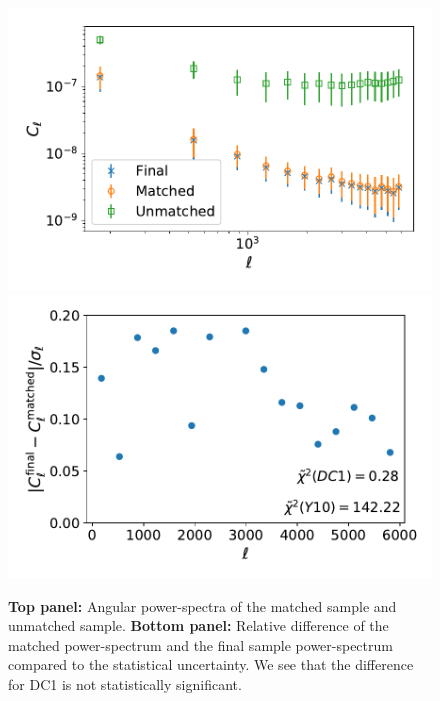 \documentclass[twocolumn]{aastex62}
\begin{document}
\begin{figure}
\centering
\includegraphics[width=0.9\columnwidth]{cl_matched_unmatched}
\includegraphics[width=0.9\columnwidth]{cl_chi2_mu}
\caption{\textbf{Top panel:} Angular power-spectra of the matched sample and unmatched sample. \textbf{Bottom panel:} Relative difference of the matched power-spectrum and the final sample power-spectrum compared to the statistical uncertainty. We see that the difference for DC1 is not statistically significant.}
\label{fig:cl_matched_unmatched}
\end{figure}
\end{document}
